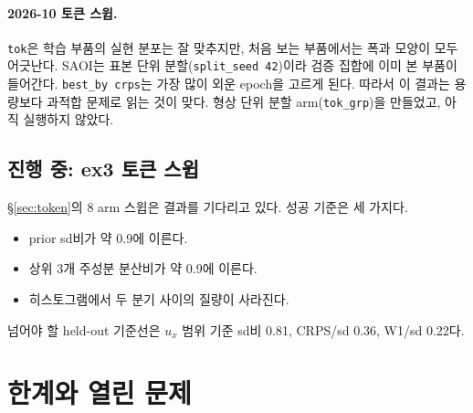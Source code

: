 \documentclass[11pt]{article}
\newcommand{\code}[1]{\texttt{#1}}
\begin{document}
\paragraph{2026-10 토큰 스윕.} \code{tok}은 학습 부품의 실현 분포는 잘
맞추지만, 처음 보는 부품에서는 폭과 모양이 모두 어긋난다. SAOI는 표본 단위
분할(\code{split\_seed 42})이라 검증 집합에 이미 본 부품이 들어간다.
\code{best\_by crps}는 가장 많이 외운 epoch을 고르게 된다. 따라서 이 결과는
용량보다 과적합 문제로 읽는 것이 맞다. 형상 단위 분할 arm(\code{tok\_grp})을
만들었고, 아직 실행하지 않았다.

\subsection{진행 중: ex3 토큰 스윕}

\S\ref{sec:token}의 8 arm 스윕은 결과를 기다리고 있다. 성공 기준은 세 가지다.
\begin{itemize}
\item prior sd비가 약 0.9에 이른다.
\item 상위 3개 주성분 분산비가 약 0.9에 이른다.
\item 히스토그램에서 두 분기 사이의 질량이 사라진다.
\end{itemize}
넘어야 할 held-out 기준선은 $u_x$ 범위 기준 sd비 0.81, CRPS/sd 0.36,
W1/sd 0.22다.

\section{한계와 열린 문제}\label{sec:limits}
\end{document}
